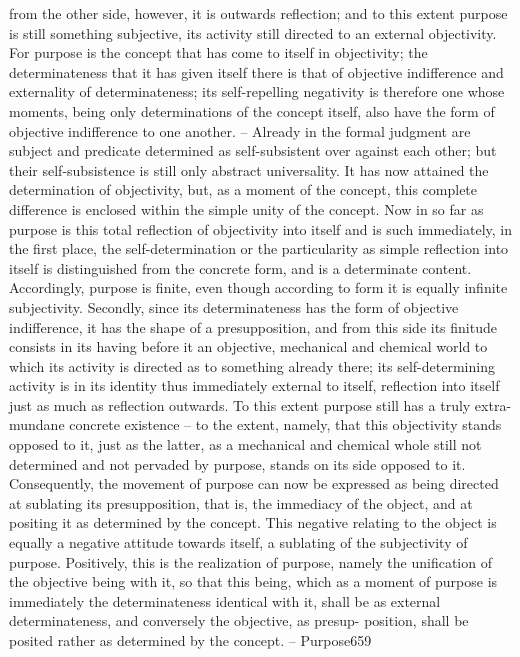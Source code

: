 from the other side, however, it is outwards reflection; and to this extent
purpose is still something subjective, its activity still directed to an external
objectivity.
For purpose is the concept that has come to itself in objectivity; the
determinateness that it has given itself there is that of objective indifference
and externality of determinateness; its self-repelling negativity is therefore
one whose moments, being only determinations of the concept itself, also
have the form of objective indifference to one another. – Already in the
formal judgment are subject and predicate determined as self-subsistent over
against each other; but their self-subsistence is still only abstract universality.
It has now attained the determination of objectivity, but, as a moment of
the concept, this complete difference is enclosed within the simple unity
of the concept. Now in so far as purpose is this total reflection of objectivity
into itself and is such immediately, in the first place, the self-determination
or the particularity as simple reflection into itself is distinguished from the
concrete form, and is a determinate content. Accordingly, purpose is finite,
even though according to form it is equally infinite subjectivity. Secondly,
since its determinateness has the form of objective indifference, it has the
shape of a presupposition, and from this side its finitude consists in its
having before it an objective, mechanical and chemical world to which
its activity is directed as to something already there; its self-determining
activity is in its identity thus immediately external to itself, reflection into
itself just as much as reflection outwards. To this extent purpose still has
a truly extra-mundane concrete existence – to the extent, namely, that this
objectivity stands opposed to it, just as the latter, as a mechanical and
chemical whole still not determined and not pervaded by purpose, stands
on its side opposed to it.
Consequently, the movement of purpose can now be expressed as being
directed at sublating its presupposition, that is, the immediacy of the object,
and at positing it as determined by the concept. This negative relating to
the object is equally a negative attitude towards itself, a sublating of the
subjectivity of purpose. Positively, this is the realization of purpose, namely
the unification of the objective being with it, so that this being, which as a
moment of purpose is immediately the determinateness identical with it,
shall be as external determinateness, and conversely the objective, as presup-
position, shall be posited rather as determined by the concept. – Purpose659
